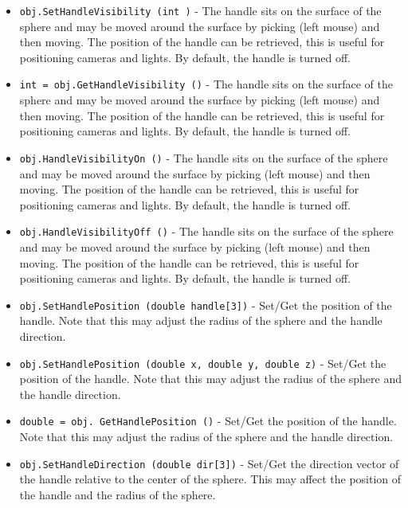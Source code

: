 \begin{itemize}
\item  \verb|obj.SetHandleVisibility (int )| -  The handle sits on the surface of the sphere and may be moved around
 the surface by picking (left mouse) and then moving. The position
 of the handle can be retrieved, this is useful for positioning cameras
 and lights. By default, the handle is turned off.

\item  \verb|int = obj.GetHandleVisibility ()| -  The handle sits on the surface of the sphere and may be moved around
 the surface by picking (left mouse) and then moving. The position
 of the handle can be retrieved, this is useful for positioning cameras
 and lights. By default, the handle is turned off.

\item  \verb|obj.HandleVisibilityOn ()| -  The handle sits on the surface of the sphere and may be moved around
 the surface by picking (left mouse) and then moving. The position
 of the handle can be retrieved, this is useful for positioning cameras
 and lights. By default, the handle is turned off.

\item  \verb|obj.HandleVisibilityOff ()| -  The handle sits on the surface of the sphere and may be moved around
 the surface by picking (left mouse) and then moving. The position
 of the handle can be retrieved, this is useful for positioning cameras
 and lights. By default, the handle is turned off.

\item  \verb|obj.SetHandlePosition (double handle[3])| -  Set/Get the position of the handle. Note that this may adjust the radius
 of the sphere and the handle direction.

\item  \verb|obj.SetHandlePosition (double x, double y, double z)| -  Set/Get the position of the handle. Note that this may adjust the radius
 of the sphere and the handle direction.

\item  \verb|double = obj. GetHandlePosition ()| -  Set/Get the position of the handle. Note that this may adjust the radius
 of the sphere and the handle direction.

\item  \verb|obj.SetHandleDirection (double dir[3])| -  Set/Get the direction vector of the handle relative to the center of
 the sphere. This may affect the position of the handle and the radius
 of the sphere.


\end{itemize}
